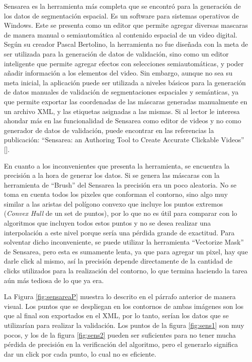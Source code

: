 Sensarea es la herramienta más completa que se encontró para la generación de los datos de segmentación espacial. Es un software para sistemas operativos de Windows. Este se presenta como un editor que permite agregar diversas mascaras de manera manual o semiautomática al contenido espacial de un video digital. Según su creador Pascal Bertolino, la herramienta no fue diseñada con la meta de ser utilizada para la generación de datos de validación, sino como un editor inteligente que permite agregar efectos con selecciones semiautomáticas, y poder añadir información a los elementos del video. Sin embargo, aunque no sea su meta inicial, la aplicación puede ser utilizada a niveles básicos para la generación de datos manuales de validación de segmentaciones espaciales y semánticas, ya que permite exportar las coordenadas de las máscaras generadas manualmente en un archivo XML, y las etiquetas asignadas a las mismas. Si al lector le interesa ahondar más en las funcionalidad de Sensarea como editor de videos y no como generador de datos de validación, puede encontrar en las referencias la publicación: ``Sensarea: an Authoring Tool to Create Accurate Clickable Videos'' [\cite{bertolino}].

En cuanto a los inconvenientes que presenta la herramienta, se encuentra la precisión a la hora de generar los datos. Si se genera las máscaras con la herramienta de ``Brush'' del Sensarea la precisión era un poco aleatoria. No se toma en cuenta todos los pixeles que conforman el contorno, sino algo muy similar a las aristas del polígono convexo que incluye los puntos extremos (\textit{Convex Hull} de un set de puntos), por lo que no es útil para comparar con lo algoritmos que incluyen todos estos puntos y no se desea realizar una interpolación a este nivel porque sería una pérdida grande de exactitud. Para solventar dicho inconveniente, se puede utilizar la herramienta ``Vectorize Mask'' de Sensarea, pero esta es sumamente lenta, ya que para agregar un pixel, hay que darle click al mismo, así la precisión depende directamente de la cantidad de clicks utilizados para la realización del contorno, lo que termina haciendo la tarea aún más tediosa de lo que ya era.

La Figura \ref{fig:sensareaP} muestra lo descrito en el párrafo anterior de manera visual. Los puntos que se despliegan en los contornos de ambas imágenes son los que al final son exportados en el XML, por lo tanto, serían los datos que se utilizarían para realizar la validación. Los puntos de la figura \ref{fig:sens1} son muy pocos, y los de la figura \ref{fig:sens2} pueden ser suficientes para no tener mucha pérdida de precisión en la verificación del algoritmo, pero el generarlo significa dar un click por cada punto, lo cual no es eficiente.

